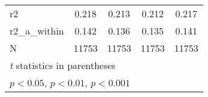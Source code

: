 {\begin{tabular}{l*{4}{c}}
\hline
r2          &       0.218         &       0.213         &       0.212         &       0.217         \\
r2\_a\_within &       0.142         &       0.136         &       0.135         &       0.141         \\
N           &       11753         &       11753         &       11753         &       11753         \\
\hline\hline
\multicolumn{5}{l}{\footnotesize \textit{t} statistics in parentheses}\\
\multicolumn{5}{l}{\footnotesize \sym{*} \(p<0.05\), \sym{**} \(p<0.01\), \sym{***} \(p<0.001\)}\\
\end{tabular}
}
